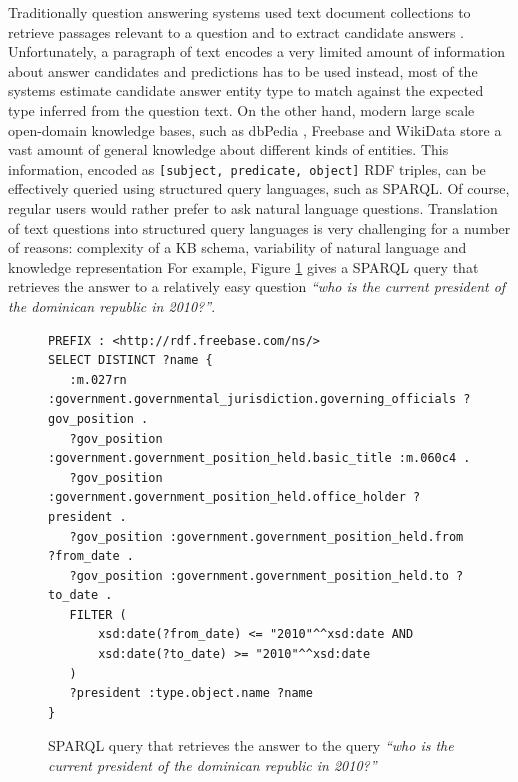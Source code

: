 Traditionally question answering systems used text document collections to retrieve passages relevant to a question and to extract candidate answers \cite{Vrandecic:2014:WFC:2661061.2629489}.
Unfortunately, a paragraph of text encodes a very limited amount of information about answer candidates and predictions has to be used instead, \eg most of the systems estimate candidate answer entity type to match against the expected type inferred from the question text.
On the other hand, modern large scale open-domain knowledge bases, such as dbPedia \cite{auer2007dbpedia}, Freebase \cite{Bollacker:2008:FCC:1376616.1376746} and WikiData \cite{Vrandecic:2014:WFC:2661061.2629489} store a vast amount of general knowledge about different kinds of entities.
This information, encoded as \texttt{[subject, predicate, object]} RDF triples, can be effectively queried using structured query languages, such as SPARQL.
Of course, regular users would rather prefer to ask natural language questions.
Translation of text questions into structured query languages is very challenging for a number of reasons: complexity of a KB schema, variability of natural language and knowledge representation \etc
For example, Figure \ref{fig:example_sparql} gives a SPARQL query that retrieves the answer to a relatively easy question \textit{``who is the current president of the dominican republic in 2010?''}.

\begin{figure}
\centering
\begin{lstlisting}[frame=single]
PREFIX : <http://rdf.freebase.com/ns/>
SELECT DISTINCT ?name {
   :m.027rn :government.governmental_jurisdiction.governing_officials ?gov_position .
   ?gov_position :government.government_position_held.basic_title :m.060c4 .
   ?gov_position :government.government_position_held.office_holder ?president .
   ?gov_position :government.government_position_held.from ?from_date .
   ?gov_position :government.government_position_held.to ?to_date .
   FILTER (
       xsd:date(?from_date) <= "2010"^^xsd:date AND
       xsd:date(?to_date) >= "2010"^^xsd:date
   )
   ?president :type.object.name ?name
}
\end{lstlisting}
\caption{SPARQL query that retrieves the answer to the query \textit{``who is the current president of the dominican republic in 2010?''}}
\label{fig:example_sparql}
\end{figure}


